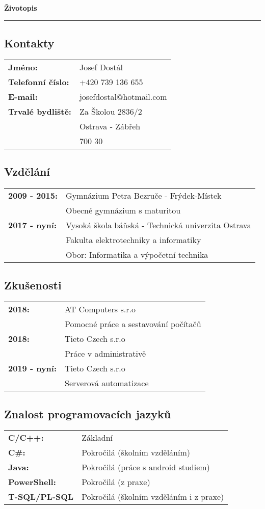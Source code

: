 \documentclass{article}
\begin{document}
\begin{center}
	\huge{\textbf{Životopis}}
	\par\noindent\rule{\textwidth}{0.4pt}
\end{center}

\subsection*{Kontakty}
\begin{tabular}{>{\bfseries}l l}
	Jméno: & Josef Dostál \\
	Telefonní číslo: & +420 739 136 655 \\
	E-mail: & josefdostal@hotmail.com \\
	Trvalé bydliště: & Za Školou 2836/2 \\
					 & Ostrava - Zábřeh \\
					 & 700 30
\end{tabular}

\subsection*{Vzdělání}
\begin{tabular}{>{\bfseries}l l}
	2009 - 2015: & Gymnázium Petra Bezruče - Frýdek-Místek \\
				 & Obecné gymnázium s maturitou \\
	2017 - nyní: & Vysoká škola báňská - Technická univerzita Ostrava \\
				 & Fakulta elektrotechniky a informatiky \\
				 & Obor: Informatika a výpočetní technika \\
\end{tabular}

\subsection*{Zkušenosti}
\begin{tabular}{>{\bfseries}l l}
	2018: & AT Computers s.r.o \\
		  & Pomocné práce a sestavování počítačů \\
	2018: & Tieto Czech s.r.o \\
		  & Práce v administrativě \\
	2019 - nyní: & Tieto Czech s.r.o \\
				 & Serverová automatizace
\end{tabular}

\subsection*{Znalost programovacích jazyků}
\begin{tabular}{>{\bfseries}l l}
	C/C++: & Základní \\
	C\#: & Pokročilá (školním vzděláním) \\
	Java: & Pokročilá (práce s android studiem) \\
	PowerShell: & Pokročilá (z praxe) \\
	T-SQL/PL-SQL & Pokročilá (školním vzděláním i z praxe) \\
\end{tabular}
\end{document}
